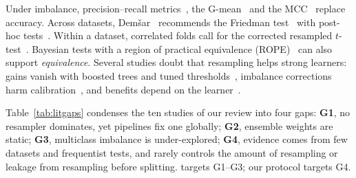 Under imbalance, precision--recall metrics~\cite{saito2015precision}, the G-mean~\cite{kubat1997addressing} and the
MCC~\cite{chicco2020advantages} replace accuracy. Across datasets, Dem\v{s}ar~\cite{demsar2006statistical} recommends the
Friedman test~\cite{friedman1937use,iman1980approximations} with post-hoc
tests~\cite{nemenyi1963distribution,holm1979simple}. Within a dataset, correlated folds call for the corrected
resampled $t$-test~\cite{nadeau2003inference,bouckaert2004evaluating}. Bayesian tests with a region of practical
equivalence (ROPE)~\cite{benavoli2017time,corani2015bayesian,benavoli2014bayesian} can also support \emph{equivalence}.
Several studies doubt that resampling helps strong learners: gains vanish with boosted trees and tuned
thresholds~\cite{elor2022smote}, imbalance corrections harm calibration~\cite{vandengoorbergh2022harm}, and benefits
depend on the learner~\cite{vanhulse2007experimental}.

Table~\ref{tab:litgaps} condenses the ten studies of our review into four gaps:
\textbf{G1}, no resampler dominates, yet pipelines fix one globally;
\textbf{G2}, ensemble weights are static;
\textbf{G3}, multiclass imbalance is under-explored;
\textbf{G4}, evidence comes from few datasets and frequentist tests, and rarely controls the amount of resampling or
leakage from resampling before splitting.
\ars{} targets G1--G3; our protocol targets G4.

